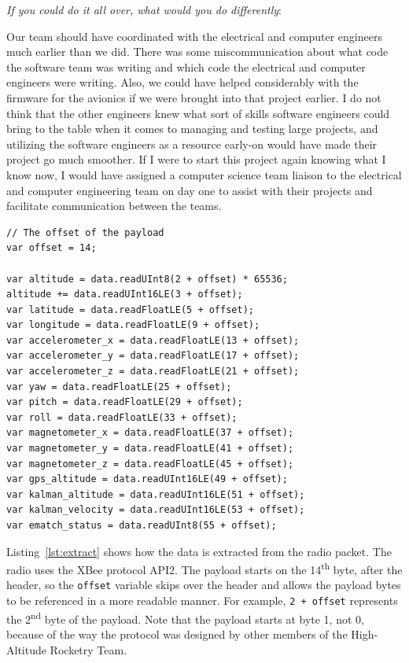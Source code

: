 \documentclass[10pt,draftclsnofoot,onecolumn]{IEEEtran}
\newcommand{\subsubsubsection}[1]{
	\hfill\break\textit{#1}:
}
\begin{document}
\subsubsubsection{If you could do it all over, what would you do differently}
Our team should have coordinated with the electrical and computer engineers much earlier than we did.
There was some miscommunication about what code the software team was writing and which code the electrical and computer engineers were writing.
Also, we could have helped considerably with the firmware for the avionics if we were brought into that project earlier.
I do not think that the other engineers knew what sort of skills software engineers could bring to the table when it comes to managing and testing large projects,
and utilizing the software engineers as a resource early-on would have made their project go much smoother.
If I were to start this project again knowing what I know now, I would have assigned a computer science team liaison to the electrical and computer engineering team on day one
to assist with their projects and facilitate communication between the teams.

















\newpage
{}

\begin{lstlisting}[caption={Telemetry payload data extraction},label={lst:extract}]
// The offset of the payload
var offset = 14;

var altitude = data.readUInt8(2 + offset) * 65536;
altitude += data.readUInt16LE(3 + offset);
var latitude = data.readFloatLE(5 + offset);
var longitude = data.readFloatLE(9 + offset);
var accelerometer_x = data.readFloatLE(13 + offset);
var accelerometer_y = data.readFloatLE(17 + offset);
var accelerometer_z = data.readFloatLE(21 + offset);
var yaw = data.readFloatLE(25 + offset);
var pitch = data.readFloatLE(29 + offset);
var roll = data.readFloatLE(33 + offset);
var magnetometer_x = data.readFloatLE(37 + offset);
var magnetometer_y = data.readFloatLE(41 + offset);
var magnetometer_z = data.readFloatLE(45 + offset);
var gps_altitude = data.readUInt16LE(49 + offset);
var kalman_altitude = data.readUInt16LE(51 + offset);
var kalman_velocity = data.readUInt16LE(53 + offset);
var ematch_status = data.readUInt8(55 + offset);
\end{lstlisting}

Listing~\ref{lst:extract} shows how the data is extracted from the radio packet.
The radio uses the XBee protocol API2.
The payload starts on the 14\textsuperscript{th} byte, after the header, so the \texttt{offset} variable skips
over the header and allows the payload bytes to be referenced in a more readable manner.
For example, \texttt{2 + offset} represents the 2\textsuperscript{nd} byte of the payload.
Note that the payload starts at byte 1, not 0, because of the way the protocol was designed by other members of the High-Altitude Rocketry Team.
\end{document}
